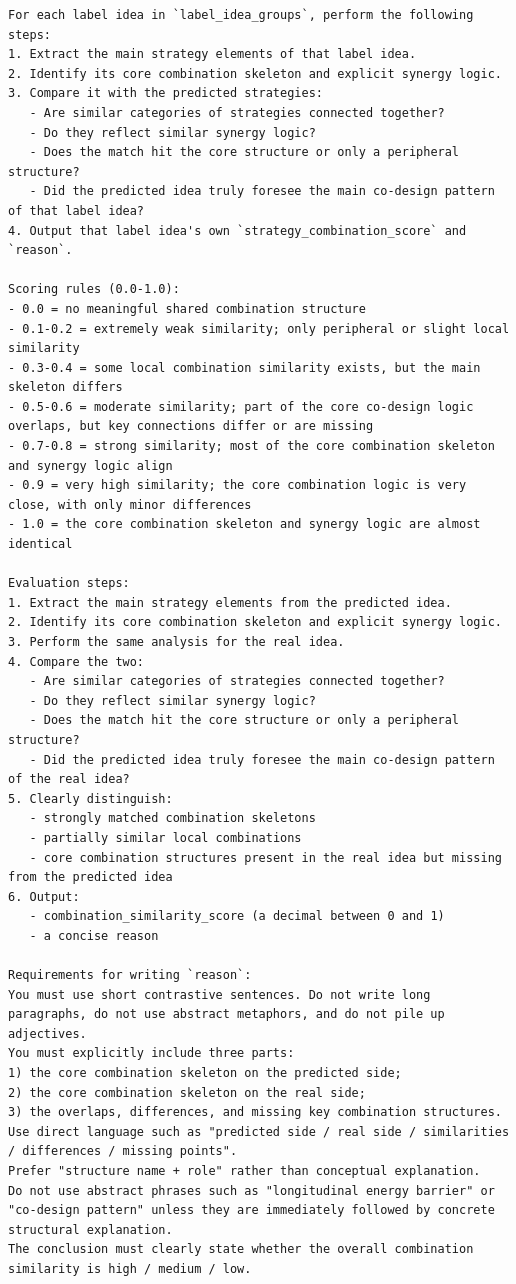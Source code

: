 \begin{lstlisting}[style=jsonstyle]
For each label idea in `label_idea_groups`, perform the following steps:
1. Extract the main strategy elements of that label idea.
2. Identify its core combination skeleton and explicit synergy logic.
3. Compare it with the predicted strategies:
   - Are similar categories of strategies connected together?
   - Do they reflect similar synergy logic?
   - Does the match hit the core structure or only a peripheral structure?
   - Did the predicted idea truly foresee the main co-design pattern of that label idea?
4. Output that label idea's own `strategy_combination_score` and `reason`.

Scoring rules (0.0-1.0):
- 0.0 = no meaningful shared combination structure
- 0.1-0.2 = extremely weak similarity; only peripheral or slight local similarity
- 0.3-0.4 = some local combination similarity exists, but the main skeleton differs
- 0.5-0.6 = moderate similarity; part of the core co-design logic overlaps, but key connections differ or are missing
- 0.7-0.8 = strong similarity; most of the core combination skeleton and synergy logic align
- 0.9 = very high similarity; the core combination logic is very close, with only minor differences
- 1.0 = the core combination skeleton and synergy logic are almost identical

Evaluation steps:
1. Extract the main strategy elements from the predicted idea.
2. Identify its core combination skeleton and explicit synergy logic.
3. Perform the same analysis for the real idea.
4. Compare the two:
   - Are similar categories of strategies connected together?
   - Do they reflect similar synergy logic?
   - Does the match hit the core structure or only a peripheral structure?
   - Did the predicted idea truly foresee the main co-design pattern of the real idea?
5. Clearly distinguish:
   - strongly matched combination skeletons
   - partially similar local combinations
   - core combination structures present in the real idea but missing from the predicted idea
6. Output:
   - combination_similarity_score (a decimal between 0 and 1)
   - a concise reason

Requirements for writing `reason`:
You must use short contrastive sentences. Do not write long paragraphs, do not use abstract metaphors, and do not pile up adjectives.
You must explicitly include three parts:
1) the core combination skeleton on the predicted side;
2) the core combination skeleton on the real side;
3) the overlaps, differences, and missing key combination structures.
Use direct language such as "predicted side / real side / similarities / differences / missing points".
Prefer "structure name + role" rather than conceptual explanation.
Do not use abstract phrases such as "longitudinal energy barrier" or "co-design pattern" unless they are immediately followed by concrete structural explanation.
The conclusion must clearly state whether the overall combination similarity is high / medium / low.


\end{lstlisting}
